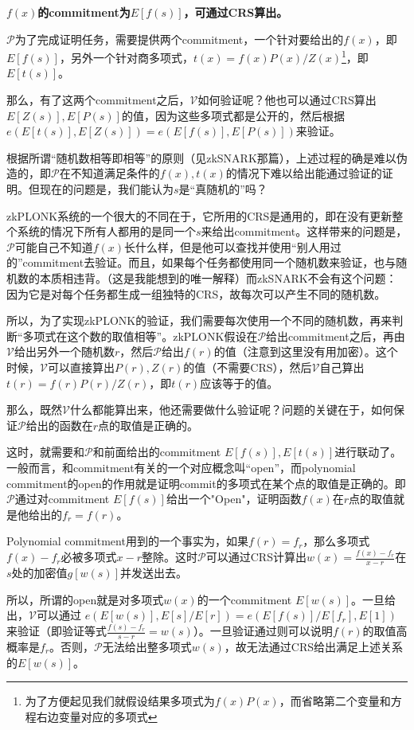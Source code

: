 \documentclass[12pt]{article}
\newcommand{\zk}{zkPLONK}
\newcommand{\pp}{$\mathcal{P}$}
\newcommand{\vv}{$\mathcal{V}$}
\begin{document}
\textbf{$f(x)$的commitment为$E[f(s)]$，可通过CRS算出。}

\pp 为了完成证明任务，需要提供两个commitment，一个针对要给出的$f(x)$，即$E[f(s)]$，另外一个针对商多项式，$t(x)=f(x)P(x)/Z(x)$\footnote{为了方便起见我们就假设结果多项式为$f(x)P(x)$，而省略第二个变量和方程右边变量对应的多项式}，即$E[t(s)]$。

那么，有了这两个commitment之后，\vv 如何验证呢？他也可以通过CRS算出$E[Z(s)],E[P(s)]$的值，因为这些多项式都是公开的，然后根据$e(E[t(s)],E[Z(s)])=e(E[f(s)],E[P(s)])$来验证。

根据所谓“随机数相等即相等”的原则（见zkSNARK那篇），上述过程的确是难以伪造的，即\pp 在不知道满足条件的$f(x),t(x)$的情况下难以给出能通过验证的证明。但现在的问题是，我们能认为$s$是“真随机的”吗？

\zk 系统的一个很大的不同在于，它所用的CRS是通用的，即在没有更新整个系统的情况下所有人都用的是同一个$s$来给出commitment。这样带来的问题是，\pp 可能自己不知道$f(x)$长什么样，但是他可以查找并使用“别人用过的”commitment去验证。而且，如果每个任务都使用同一个随机数来验证，也与随机数的本质相违背。（这是我能想到的唯一解释）而zkSNARK不会有这个问题：因为它是对每个任务都生成一组独特的CRS，故每次可以产生不同的随机数。

所以，为了实现\zk 的验证，我们需要每次使用一个不同的随机数，再来判断“多项式在这个数的取值相等”。\zk 假设在\pp 给出commitment之后，再由\vv 给出另外一个随机数$r$，然后\pp 给出$f(r)$的值（注意到这里没有用加密）。这个时候，\vv 可以直接算出$P(r),Z(r)$的值（不需要CRS），然后\vv 自己算出$t(r)=f(r)P(r)/Z(r)$，即$t(r)$应该等于的值。

那么，既然\vv 什么都能算出来，他还需要做什么验证呢？问题的关键在于，如何保证\pp 给出的函数在$r$点的取值是正确的。

这时，就需要和\pp 和前面给出的commitment $E[f(s)],E[t(s)]$进行联动了。一般而言，和commitment有关的一个对应概念叫“open”，而polynomial commitment的open的作用就是证明commit的多项式在某个点的取值是正确的。即\pp 通过对commitment $E[f(s)]$给出一个"Open"，证明函数$f(x)$在$r$点的取值就是他给出的$f_r=f(r)$。

Polynomial commitment用到的一个事实为，如果$f(r)=f_r$，那么多项式$f(x)-f_r$必被多项式$x-r$整除。这时\pp 可以通过CRS计算出$w(x)=\frac{f(x)-f_r}{x-r}$在$s$处的加密值$g[w(s)]$并发送出去。

所以，所谓的open就是对多项式$w(x)$的一个commitment $E[w(s)]$。一旦给出，\vv 可以通过 $e(E[w(s)],E[s]/E[r])=e(E[f(s)]/E[f_r],E[1])$来验证（即验证等式$\frac{f(s)-f_r}{s-r}=w(s)$）。一旦验证通过则可以说明$f(r)$的取值高概率是$f_r$。否则，\pp 无法给出整多项式$w(s)$，故无法通过CRS给出满足上述关系的$E[w(s)]$。
\end{document}
